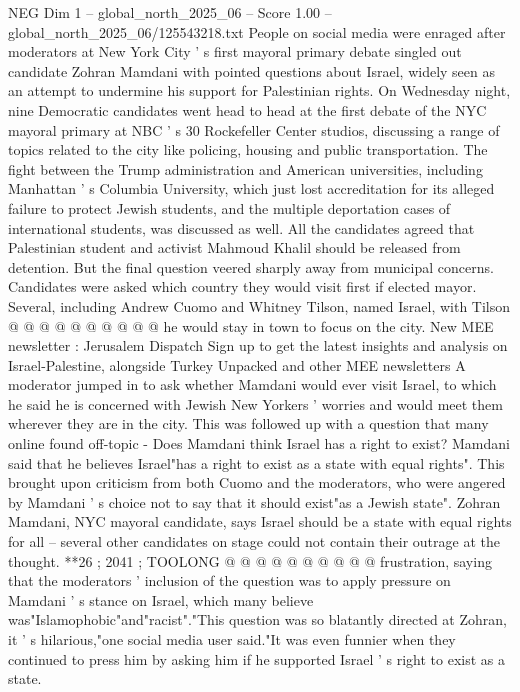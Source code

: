 \begin{textsample}{NEG Dim 1 – global\_north\_2025\_06 – Score 1.00 – global\_north\_2025\_06/125543218.txt}  \label{ex:f1_neg_145}
People on social media were enraged after moderators at New York City ' s first mayoral primary debate singled out candidate Zohran Mamdani with pointed questions about Israel, widely seen as an attempt to undermine his support for Palestinian rights.
On Wednesday night, nine Democratic candidates went head to head at the first debate of the NYC mayoral primary at NBC ' s 30 Rockefeller Center studios, discussing a range of topics related to the city like policing, housing and public transportation.
The fight between the Trump administration and American universities, including Manhattan ' s Columbia University, which just lost accreditation for its alleged failure to protect Jewish students, and the multiple deportation cases of international students, was discussed as well.
All the candidates agreed that Palestinian student and activist Mahmoud Khalil should be released from detention.
But the final question veered sharply away from municipal concerns.
Candidates were asked which country they would visit first if elected mayor.
Several, including Andrew Cuomo and Whitney Tilson, named Israel, with Tilson @ @ @ @ @ @ @ @ @ @ he would stay in town to focus on the city.
New MEE newsletter : Jerusalem Dispatch Sign up to get the latest insights and analysis on Israel-Palestine, alongside Turkey Unpacked and other MEE newsletters A moderator jumped in to ask whether Mamdani would ever visit Israel, to which he said he is concerned with Jewish New Yorkers ' worries and would meet them wherever they are in the city.
This was followed up with a question that many online found off-topic - Does Mamdani think Israel has a right to exist?
Mamdani said that he believes Israel"has a right to exist as a state with equal rights".
This brought upon criticism from both Cuomo and the moderators, who were angered by Mamdani ' s choice not to say that it should exist"as a Jewish state".
Zohran Mamdani, NYC mayoral candidate, says Israel should be a state with equal rights for all -- several other candidates on stage could not contain their outrage at the thought. **26 ; 2041 ; TOOLONG @ @ @ @ @ @ @ @ @ @ frustration, saying that the moderators ' inclusion of the question was to apply pressure on Mamdani ' s stance on Israel, which many believe was"Islamophobic"and"racist"."This question was so blatantly directed at Zohran, it ' s hilarious,"one social media user said."It was even funnier when they continued to press him by asking him if he supported Israel ' s right to exist as a state.

\end{textsample}
